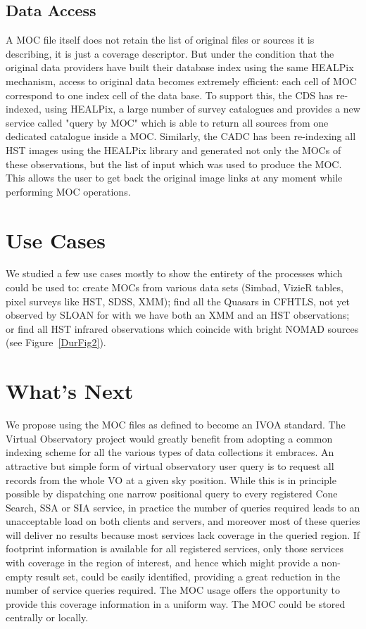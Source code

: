 \subsection{Data Access}
A MOC file itself does not retain the list of original files or sources it is describing, it is just a coverage descriptor. But under the condition that the original data providers have built their database index using the same HEALPix mechanism, access to original data becomes extremely efficient: each cell of MOC correspond to one index cell of the data base. 
To support this, the CDS has re-indexed, using HEALPix, a large number of survey catalogues and provides a new service called "query by MOC" which is able to return all sources from one dedicated catalogue inside a MOC. Similarly, the CADC has been re-indexing all HST images using the HEALPix library and generated not only the MOCs of these observations, but the list of input which was used to produce the MOC. This allows the user to get back the original image links at any moment while performing MOC operations.


\section{Use Cases}
We studied a few use cases mostly to show the entirety of the processes which could be used to: create MOCs from various data sets (Simbad, VizieR tables, pixel surveys like HST, SDSS, XMM); find all the Quasars in CFHTLS, not yet observed by SLOAN for with we have both an XMM and an HST observations; or find all HST infrared observations which coincide with bright NOMAD sources (see Figure~\ref{DurFig2}).


\section{What's Next}

We propose using the MOC files as defined to become an IVOA standard. 
The Virtual Observatory project would greatly benefit from adopting a common indexing scheme for all the various types of data collections it embraces. 
An attractive but simple form of virtual observatory user query is
to request all records from the whole VO at a given sky position.
While this is in principle possible by dispatching one narrow
positional query to every registered Cone Search, SSA or SIA service,
in practice the number of queries required leads to an unacceptable
load on both clients and servers, and moreover most of these queries
will deliver no results because most services lack coverage in the
queried region. If footprint information is available for all registered services, only those
services with coverage in the region of interest, and hence which
might provide a non-empty result set, could be easily identified,
providing a great reduction in the number of service queries required.
The MOC usage offers the opportunity to provide
this coverage information in a uniform way. The MOC could be stored centrally or locally.



